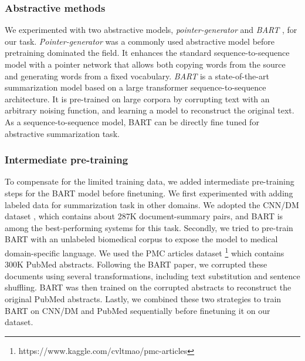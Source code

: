\documentclass[letterpaper, table]{article} %
\begin{document}
\subsubsection{Abstractive methods}
We experimented with two abstractive models, \textit{pointer-generator} \cite{see2017get} and \textit{BART} \cite{lewis2019bart}, for our task. \textit{Pointer-generator} was a commonly used abstractive model before pretraining dominated the field. It enhances the standard sequence-to-sequence model with a pointer network that allows both copying words from the source and generating words from a fixed vocabulary. \textit{BART} is a state-of-the-art summarization model based on a large transformer sequence-to-sequence architecture. It is pre-trained on large corpora by corrupting text with an arbitrary noising function, and learning a model to reconstruct the original text.
As a sequence-to-sequence model, BART can be directly fine tuned for abstractive summarization task.
\subsubsection{Intermediate pre-training}
\label{sec:inter-pretraining}
To compensate for the limited training data, we added intermediate pre-training steps for the BART model before finetuning.
We first experimented with adding labeled data for summarization task in other domains. We adopted the CNN/DM dataset \cite{nallapati2016abstractive}, which contains about 287K document-summary pairs, and BART is among the best-performing systems for this task. %
Secondly, we tried to pre-train BART with an unlabeled biomedical corpus to expose the model to medical domain-specific language. We used the PMC articles dataset \footnote{https://www.kaggle.com/cvltmao/pmc-articles}
which contains 300K PubMed abstracts. Following the BART paper, we corrupted these documents using several transformations, including text substitution and sentence shuffling. BART was then trained on the corrupted abstracts to reconstruct the original PubMed abstracts. Lastly, we combined these two strategies to train BART on CNN/DM and PubMed sequentially before finetuning it on our dataset.
\end{document}
